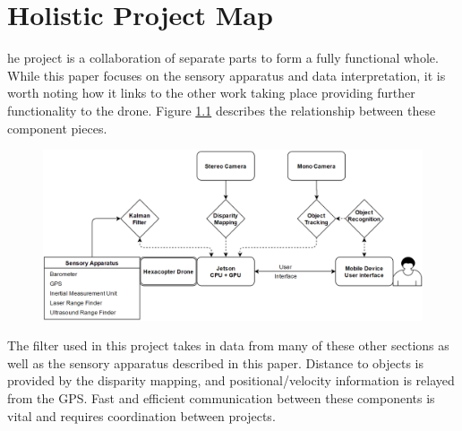 \let\textcircled=\pgftextcircled
\chapter{Holistic Project Map}
\label{chap:map}

he project is a collaboration of separate parts to form a fully functional whole. While this paper focuses on the sensory apparatus and data interpretation, it is worth noting how it links to the other work taking place providing further functionality to the drone. Figure \ref{fig:map} describes the relationship between these component pieces.

\begin{figure}
\includegraphics[width=\textwidth]{largeprojectdiagramwhite.png}
\label{fig:map}
\end{figure}

The filter used in this project takes in data from many of these other sections as well as the sensory apparatus described in this paper. Distance to objects is provided by the disparity mapping, and positional/velocity information is relayed from the GPS. Fast and efficient communication between these components is vital and requires coordination between projects.
